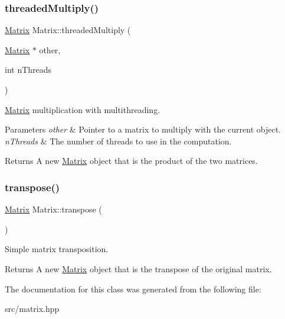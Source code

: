 \subsubsection{\texorpdfstring{threaded\+Multiply()}{threadedMultiply()}}
{\footnotesize\ttfamily \hyperlink{classMatrix}{Matrix} Matrix\+::threaded\+Multiply (\begin{DoxyParamCaption}\item[{\hyperlink{classMatrix}{Matrix} $\ast$}]{other,  }\item[{int}]{n\+Threads }\end{DoxyParamCaption})}



\hyperlink{classMatrix}{Matrix} multiplication with multithreading. 


\begin{DoxyParams}{Parameters}
{\em other} & Pointer to a matrix to multiply with the current object. \\
\hline
{\em n\+Threads} & The number of threads to use in the computation. \\
\hline
\end{DoxyParams}
\begin{DoxyReturn}{Returns}
A new \hyperlink{classMatrix}{Matrix} object that is the product of the two matrices. 
\end{DoxyReturn}
\mbox{\label{classMatrix_ae23f817021383e3c8636a714dcba1d21}} 
\subsubsection{\texorpdfstring{transpose()}{transpose()}}
{\footnotesize\ttfamily \hyperlink{classMatrix}{Matrix} Matrix\+::transpose (\begin{DoxyParamCaption}{ }\end{DoxyParamCaption})}



Simple matrix transposition. 

\begin{DoxyReturn}{Returns}
A new \hyperlink{classMatrix}{Matrix} object that is the transpose of the original matrix. 
\end{DoxyReturn}


The documentation for this class was generated from the following file\+:\begin{DoxyCompactItemize}
\item 
src/matrix.\+hpp\end{DoxyCompactItemize}
